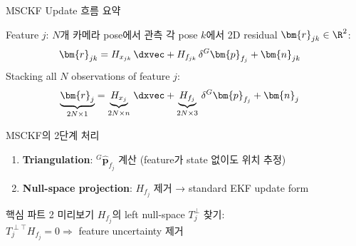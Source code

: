 \begin{frame}[shrink=10]{MSCKF Update 흐름 요약}
  \begin{block}{Feature $j$: $N$개 카메라 pose에서 관측}
    각 pose $k$에서 2D residual $\bm{r}_{jk} \in \R^2$:
    \begin{align*}
      \bm{r}_{jk} &= H_{x_{jk}}\,\dxvec + H_{f_{jk}}\,\delta{}^G\bm{p}_{f_j} + \bm{n}_{jk}
    \end{align*}
    Stacking all $N$ observations of feature $j$:
    \begin{align*}
      \underbrace{\bm{r}_j}_{2N\times 1} &=
      \underbrace{H_{x_j}}_{2N\times n}\,\dxvec
      + \underbrace{H_{f_j}}_{2N\times 3}\,\delta{}^G\bm{p}_{f_j}
      + \bm{n}_j
    \end{align*}
  \end{block}
  \begin{exampleblock}{MSCKF의 2단계 처리}
    \begin{enumerate}
      \item \textbf{Triangulation}: ${}^G\hat{\bm{p}}_{f_j}$ 계산 (feature가 state 없이도 위치 추정)
      \item \textbf{Null-space projection}: $H_{f_j}$ 제거 → standard EKF update form
    \end{enumerate}
  \end{exampleblock}
  \begin{alertblock}{핵심 파트 2 미리보기}
    $H_{f_j}$의 left null-space $T_j^\perp$ 찾기:\\
    $T_j^{\perp\top} H_{f_j} = 0 \Rightarrow$ feature uncertainty 제거
  \end{alertblock}
\end{frame}


